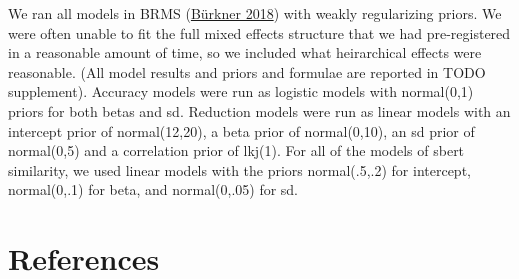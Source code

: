 \documentclass[
  english,
  a4paper,
]{article}
\begin{document}
We ran all models in BRMS (\protect\hyperlink{ref-burkner2018}{Bürkner 2018}) with weakly regularizing priors. We were often unable to fit the full mixed effects structure that we had pre-registered in a reasonable amount of time, so we included what heirarchical effects were reasonable. (All model results and priors and formulae are reported in TODO supplement). Accuracy models were run as logistic models with normal(0,1) priors for both betas and sd. Reduction models were run as linear models with an intercept prior of normal(12,20), a beta prior of normal(0,10), an sd prior of normal(0,5) and a correlation prior of lkj(1). For all of the models of sbert similarity, we used linear models with the priors normal(.5,.2) for intercept, normal(0,.1) for beta, and normal(0,.05) for sd.

\hypertarget{references}{%
\section{References}\label{references}}

\setlength{\parindent}{-0.1in} 
\setlength{\leftskip}{0.125in}

\noindent
\end{document}
